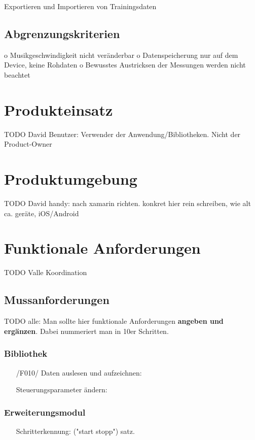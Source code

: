 \documentclass[a4paper,12pt]{article}
\begin{document}
  Exportieren und Importieren von Trainingsdaten
  \subsection{Abgrenzungskriterien}
  o	Musikgeschwindigkeit nicht veränderbar
o	Datenspeicherung nur auf dem Device, keine Rohdaten
o	Bewusstes Austricksen der Messungen werden nicht beachtet


\section{Produkteinsatz}
TODO David 
Benutzer:   Verwender der Anwendung/Bibliotheken. Nicht der Product-Owner

\section{Produktumgebung}
TODO David
handy: nach xamarin richten. konkret hier rein schreiben, wie alt ca. geräte, iOS/Android

\section{Funktionale Anforderungen}
TODO Valle Koordination

  \subsection{Mussanforderungen}
  TODO alle: Man sollte hier funktionale Anforderungen \textbf{angeben und ergänzen}. Dabei nummeriert man in 10er Schritten.
    \subsubsection{Bibliothek}
    \begin{itemize}
      \item[/F010/] \textsf{Daten auslesen und aufzeichnen:} 
      \item[] \textsf{Steuerungsparameter ändern:}
    \end{itemize}
    \subsubsection{Erweiterungsmodul}
    \begin{itemize}
      \item[] \textsf{Schritterkennung:} ("start stopp") satz.
    \end{itemize}
\end{document}
